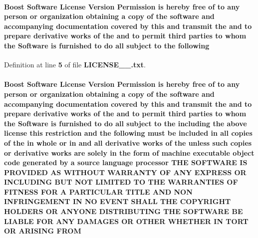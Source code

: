\paragraph[{following}]{\setlength{\rightskip}{0pt plus 5cm}Boost {\bf Software} License Version Permission is hereby free of to any person or organization obtaining a copy of the software and accompanying documentation covered by this and transmit the and to prepare derivative works of the and to permit third parties to whom the {\bf Software} is furnished to do {\bf all} subject to the following}\label{LICENSE__1__0_8txt_a6456ded5c048da496cc831b5b41221fd}


Definition at line {\bf 5} of file {\bf L\+I\+C\+E\+N\+S\+E\+\_\+\_.\+txt}.

\paragraph[{F\+R\+OM}]{\setlength{\rightskip}{0pt plus 5cm}Boost {\bf Software} License Version Permission is hereby free of to any person or organization obtaining a copy of the software and accompanying documentation covered by this and transmit the and to prepare derivative works of the and to permit third parties to whom the {\bf Software} is furnished to do {\bf all} subject to the including the above {\bf license} this restriction and the {\bf following} must be included in {\bf all} copies of the in whole or in and {\bf all} derivative works of the unless such copies or derivative works are solely in the form of machine executable object code generated by a source language processor T\+HE S\+O\+F\+T\+W\+A\+RE {\bf IS} P\+R\+O\+V\+I\+D\+ED AS W\+I\+T\+H\+O\+UT W\+A\+R\+R\+A\+N\+TY OF A\+NY E\+X\+P\+R\+E\+SS OR I\+N\+C\+L\+U\+D\+I\+NG B\+UT N\+OT L\+I\+M\+I\+T\+ED TO T\+HE W\+A\+R\+R\+A\+N\+T\+I\+ES OF F\+I\+T\+N\+E\+SS F\+OR A P\+A\+R\+T\+I\+C\+U\+L\+AR T\+I\+T\+LE A\+ND N\+ON I\+N\+F\+R\+I\+N\+G\+E\+M\+E\+NT IN NO E\+V\+E\+NT S\+H\+A\+LL T\+HE C\+O\+P\+Y\+R\+I\+G\+HT H\+O\+L\+D\+E\+RS OR A\+N\+Y\+O\+NE D\+I\+S\+T\+R\+I\+B\+U\+T\+I\+NG T\+HE S\+O\+F\+T\+W\+A\+RE BE L\+I\+A\+B\+LE F\+OR A\+NY D\+A\+M\+A\+G\+ES OR O\+T\+H\+ER W\+H\+E\+T\+H\+ER IN T\+O\+RT OR A\+R\+I\+S\+I\+NG F\+R\+OM}\label{LICENSE__1__0_8txt_a7d7ff23aea27855bd7f0f9d6d4efc78f}


